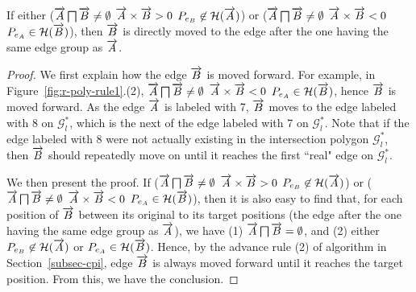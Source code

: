 \begin{prop}
\label{prop-rule2}
If either ($\protect\overrightarrow{A} \bigsqcap \protect\overrightarrow{B} \ne \emptyset$ \And $\protect\overrightarrow{A} \times \protect\overrightarrow{B} > 0$ \And $P_{e_B} \not \in \mathcal{H}(\protect\overrightarrow{A})$) or ($\protect\overrightarrow{A} \bigsqcap \protect\overrightarrow{B} \ne \emptyset$ \And $\protect\overrightarrow{A} \times \protect\overrightarrow{B} < 0$ \And $P_{e_A} \in \mathcal{H}(\protect\overrightarrow{B})$), then $\protect\overrightarrow{B}$ is directly moved to the edge after the one having the same edge group as $\protect\overrightarrow{A}$.
\end{prop}

\begin{proof}
We first explain how the edge $\protect\overrightarrow{B}$ is moved forward.
For example, in Figure~\ref{fig:r-poly-rule1}.(2), $\protect\overrightarrow{A} \bigsqcap \protect\overrightarrow{B} \ne \emptyset$ \And $\protect\overrightarrow{A} \times \protect\overrightarrow{B} < 0$ \And $P_{e_A} \in \mathcal{H}(\protect\overrightarrow{B})$, hence $\protect\overrightarrow{B}$ is moved forward. As the edge $\protect\overrightarrow{A}$ is labeled with 7,
$\protect\overrightarrow{B}$ moves to the edge labeled with 8 on $\mathcal{G}^*_{l}$, which is the next of the edge labeled with 7 on $\mathcal{G}^*_{l}$.
Note that if the edge labeled with 8 were not actually existing in the intersection polygon $\mathcal{G}^*_{l}$, then $\protect\overrightarrow{B}$ should repeatedly move on until it reaches the first ``real" edge on $\mathcal{G}^*_{l}$.

We then present the proof.
If ($\protect\overrightarrow{A} \bigsqcap \protect\overrightarrow{B} \ne \emptyset$ \And $\protect\overrightarrow{A} \times \protect\overrightarrow{B} > 0$ \And $P_{e_B} \not \in \mathcal{H}(\protect\overrightarrow{A})$) or ($\protect\overrightarrow{A} \bigsqcap \protect\overrightarrow{B} \ne \emptyset$ \And $\protect\overrightarrow{A} \times \protect\overrightarrow{B} < 0$ \And $P_{e_A} \in \mathcal{H}(\protect\overrightarrow{B})$), then it is also easy to find that, for each position of $\protect\overrightarrow{B}$ between its original to its target positions (\ie the edge after the one having the same edge group as $\protect\overrightarrow{A}$), we have (1) $\protect\overrightarrow{A} \bigsqcap \protect\overrightarrow{B} = \emptyset$, and (2) either $P_{e_B} \not \in \mathcal{H}(\protect\overrightarrow{A})$ or $P_{e_A} \in \mathcal{H}(\protect\overrightarrow{B})$. Hence, by the advance rule (2) of algorithm \cpia in Section~\ref{subsec-cpi}, edge $\protect\overrightarrow{B}$ is always moved forward until it reaches the target position. From this, we have the conclusion.
\end{proof}







